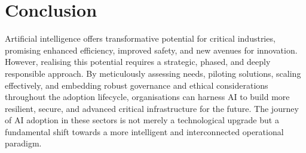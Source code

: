 \section{Conclusion}

Artificial intelligence offers transformative potential for critical industries, promising enhanced efficiency, improved safety, and new avenues for innovation. However, realising this potential requires a strategic, phased, and deeply responsible approach. By meticulously assessing needs, piloting solutions, scaling effectively, and embedding robust governance and ethical considerations throughout the adoption lifecycle, organisations can harness AI to build more resilient, secure, and advanced critical infrastructure for the future. The journey of AI adoption in these sectors is not merely a technological upgrade but a fundamental shift towards a more intelligent and interconnected operational paradigm.
